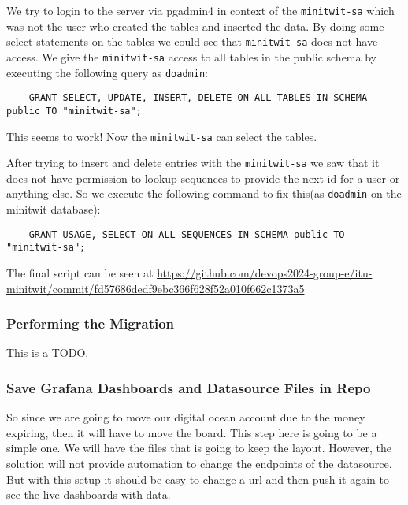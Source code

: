 We try to login to the server via pgadmin4 in context of the \texttt{minitwit-sa} which was not the user who created the tables and inserted the data. By doing some select statements on the tables we could see that \texttt{minitwit-sa} does not have access. We give the \texttt{minitwit-sa} access to all tables in the public schema by executing the following query as \texttt{doadmin}:

\begin{verbatim}
    GRANT SELECT, UPDATE, INSERT, DELETE ON ALL TABLES IN SCHEMA public TO "minitwit-sa";
\end{verbatim}

This seems to work! Now the \texttt{minitwit-sa} can select the tables.

After trying to insert and delete entries with the \texttt{minitwit-sa} we saw that it does not have permission to lookup sequences to provide the next id for a user or anything else. So we execute the following command to fix this(as \texttt{doadmin} on the minitwit database):

\begin{verbatim}
    GRANT USAGE, SELECT ON ALL SEQUENCES IN SCHEMA public TO "minitwit-sa";
\end{verbatim}

The final script can be seen at \url{https://github.com/devops2024-group-e/itu-minitwit/commit/fd57686dedf9ebc366f628f52a010f662c1373a5}

\subsubsection{Performing the Migration}
\label{log:performing-the-migration}

This is a TODO.

\subsubsection{Save Grafana Dashboards and Datasource Files in Repo}
\label{log:save-grafana-dashboards-and-datasource-files-in-repo}

So since we are going to move our digital ocean account due to the money expiring, then it will have to move the board. This step here is going to be a simple one. We will have the files that is going to keep the layout. However, the solution will not provide automation to change the endpoints of the datasource. But with this setup it should be easy to change a url and then push it again to see the live dashboards with data.

